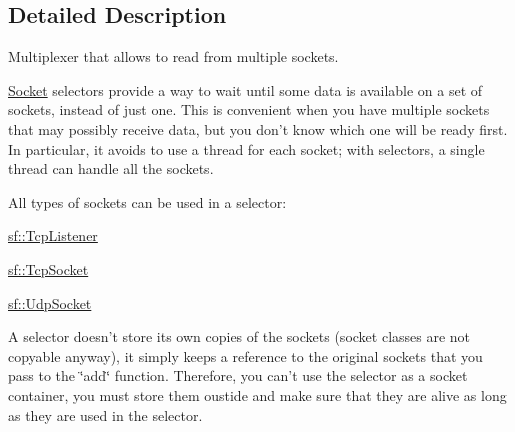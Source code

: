 \subsection{Detailed Description}
Multiplexer that allows to read from multiple sockets. 

\hyperlink{classsf_1_1Socket}{Socket} selectors provide a way to wait until some data is available on a set of sockets, instead of just one. This is convenient when you have multiple sockets that may possibly receive data, but you don't know which one will be ready first. In particular, it avoids to use a thread for each socket; with selectors, a single thread can handle all the sockets.

All types of sockets can be used in a selector\-: \begin{DoxyItemize}
\item \hyperlink{classsf_1_1TcpListener}{sf\-::\-Tcp\-Listener} \item \hyperlink{classsf_1_1TcpSocket}{sf\-::\-Tcp\-Socket} \item \hyperlink{classsf_1_1UdpSocket}{sf\-::\-Udp\-Socket}\end{DoxyItemize}
A selector doesn't store its own copies of the sockets (socket classes are not copyable anyway), it simply keeps a reference to the original sockets that you pass to the \char`\"{}add\char`\"{} function. Therefore, you can't use the selector as a socket container, you must store them oustide and make sure that they are alive as long as they are used in the selector.

